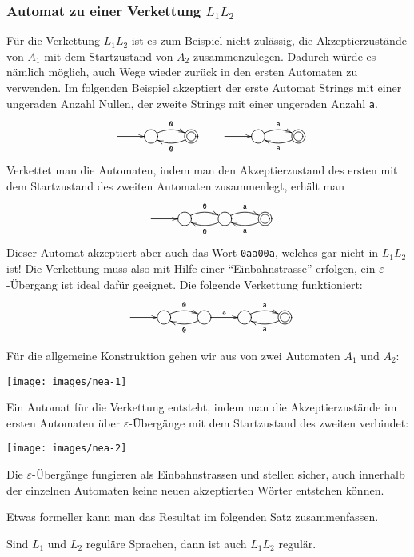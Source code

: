 \subsubsection{Automat zu einer Verkettung $L_1L_2$}
%
Für die Verkettung $L_1L_2$ ist es zum Beispiel
nicht zulässig, die Akzeptierzustände von
$A_1$ mit dem Startzustand von $A_2$ zusammenzulegen.
Dadurch
würde es nämlich möglich, auch Wege wieder zurück in
den ersten Automaten zu verwenden.
Im folgenden Beispiel akzeptiert der erste Automat Strings mit
einer ungeraden Anzahl Nullen, der zweite Strings mit einer
ungeraden Anzahl {\tt a}.
\[
\entrymodifiers={++[o][F]}
\xymatrix{
*+\txt{}\ar[r]
	&{} \ar@/^/[r]^{\tt 0}
		&*++[o][F=]{} \ar@/^/[l]^{\tt 0}
			&*\txt{}\ar[r]
				&{} \ar@/^/[r]^{\tt a}
					&*++[o][F=]{} \ar@/^/[l]^{\tt a }
}
\]
Verkettet man die Automaten, indem man den Akzeptierzustand des
ersten mit dem Startzustand des zweiten Automaten zusammenlegt,
erhält man
\[
\entrymodifiers={++[o][F]}
\xymatrix{
*+\txt{}\ar[r]
	&{} \ar@/^/[r]^{\tt 0}
		&{} \ar@/^/[l]^{\tt 0}
				 \ar@/^/[r]^{\tt a}
					&*++[o][F=]{} \ar@/^/[l]^{\tt a }
}
\]
Dieser Automat akzeptiert aber auch das Wort {\tt 0aa00a}, welches
gar nicht in $L_1L_2$ ist! Die Verkettung muss also mit Hilfe
einer ``Einbahnstrasse'' erfolgen, ein $\varepsilon$-Übergang
ist ideal dafür geeignet.
Die folgende Verkettung funktioniert:
\[
\entrymodifiers={++[o][F]}
\xymatrix{
*+\txt{}\ar[r]
	&{} \ar@/^/[r]^{\tt 0}
		&{} \ar@/^/[l]^{\tt 0} \ar[r]^{\varepsilon}
			&{} \ar@/^/[r]^{\tt a}
				&*++[o][F=]{} \ar@/^/[l]^{\tt a }
}
\]

Für die allgemeine Konstruktion gehen wir aus
von zwei Automaten $A_1$ und $A_2$:
\begin{center}
\texttt{[image: images/nea-1]}
\end{center}
Ein Automat für die Verkettung entsteht, indem man
die Akzeptierzustände im ersten Automaten über
$\varepsilon$-Übergänge mit dem
Startzustand des zweiten verbindet:
\begin{center}
\texttt{[image: images/nea-2]}
\end{center}
Die $\varepsilon$-Übergänge
fungieren als Einbahnstrassen und stellen sicher, auch innerhalb der
einzelnen Automaten keine neuen akzeptierten Wörter entstehen können.

Etwas formeller kann man das Resultat im folgenden Satz zusammenfassen.

\begin{satz}
%
\label{satz_concat}
Sind $L_1$ und $L_2$ reguläre Sprachen, dann ist auch $L_1L_2$
regulär.
\end{satz}

